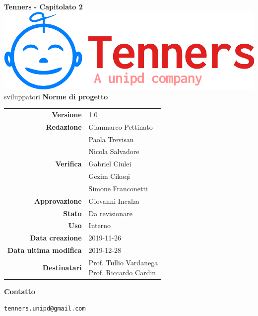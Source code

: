 \begin{titlepage}
	\begin{center}
		\large \textbf{Tenners - Capitolato 2}
		\vfill
		\includegraphics[scale = 0.3]{./res/img/logo.png}\\
sviluppatori		\vfill
		\Huge \textbf{Norme di progetto}

        \vfill
        \large

        \begin{tabular}{r|l}
                        \textbf{Versione} & 1.0 \\
                        \textbf{Redazione} &
                        Gianmarco Pettinato\\&
                        Paola Trevisan \\&
                        Nicola Salvadore \\
                        \textbf{Verifica} &
                        Gabriel Ciulei \\&
                        Gezim Cikaqi \\&
												Simone Franconetti\\
                        \textbf{Approvazione} & Giovanni Incalza\\
                        \textbf{Stato} & Da revisionare \\
                        \textbf{Uso} &  Interno\\
                        \textbf{Data creazione} &  2019-11-26\\
                        \textbf{Data ultima modifica} & 2019-12-28\\
                        \textbf{Destinatari} & \parbox[t]{5cm}{Prof. Tullio Vardanega\\Prof. Riccardo Cardin}
                \end{tabular}
                \vfill
                \normalsize
                \vfill
                \textbf{Contatto}

                \texttt{tenners.unipd@gmail.com}

	\end{center}
\end{titlepage}
